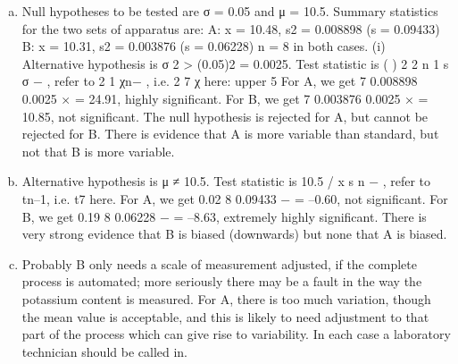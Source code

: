 \documentclass[a4paper,12pt]{article}
\begin{document}
\begin{enumerate}[(a)]
\item Null hypotheses to be tested are σ = 0.05 and μ = 10.5.
Summary statistics for the two sets of apparatus are:
A: x = 10.48, s2 = 0.008898 (s = 0.09433)
B: x = 10.31, s2 = 0.003876 (s = 0.06228)
n = 8 in both cases.
(i) Alternative hypothesis is σ 2 > (0.05)2 = 0.0025. Test statistic is ( ) 2
2
n 1 s
σ
−
,
refer to 2
1 χn− , i.e. 2
7 χ here: upper 5%
For A, we get 7 0.008898
0.0025
× = 24.91, highly significant. For B, we get
7 0.003876
0.0025
× = 10.85, not significant.
The null hypothesis is rejected for A, but cannot be rejected for B. There is
evidence that A is more variable than standard, but not that B is more variable.
\item  Alternative hypothesis is μ ≠ 10.5. Test statistic is 10.5
/
x
s n
− , refer to tn–1, i.e.
t7 here.
For A, we get 0.02 8
0.09433
− = –0.60, not significant. For B, we get 0.19 8
0.06228
− =
–8.63, extremely highly significant.
There is very strong evidence that B is biased (downwards) but none that A is
biased.
\item  Probably B only needs a scale of measurement adjusted, if the complete
process is automated; more seriously there may be a fault in the way the
potassium content is measured. For A, there is too much variation, though the
mean value is acceptable, and this is likely to need adjustment to that part of
the process which can give rise to variability. In each case a laboratory
technician should be called in.
\end{enumerate}
\end{document}
